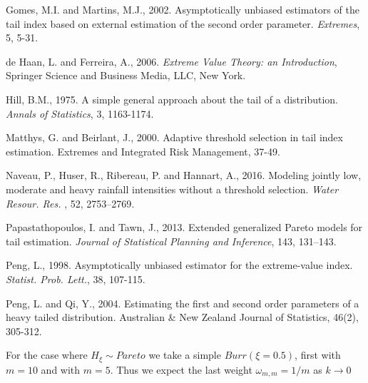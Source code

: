\documentclass[a4paper,11pt]{article}
\begin{document}
\begin{thebibliography}{99}
  Gomes, M.I. and Martins, M.J., 2002. Asymptotically unbiased estimators of the tail index based on external estimation of the second order parameter. {\it Extremes}, 5, 5-31.
  
de Haan, L. and Ferreira, A., 2006. {\it Extreme Value Theory: an Introduction}, Springer Science and Business Media, LLC, New York.  
  
 Hill, B.M., 1975. A simple general approach about the tail of a distribution. {\it Annals of Statistics}, 3, 1163-1174.
 
 Matthys, G. and Beirlant, J., 2000. Adaptive threshold selection in tail index estimation. Extremes and Integrated Risk Management, 37-49.

Naveau, P., Huser, R., Ribereau, P. and Hannart, A., 2016. Modeling jointly low, moderate and heavy rainfall intensities without a threshold selection. {\it Water Resour. Res. }, 52,
  2753--2769.

Papastathopoulos, I. and Tawn, J., 2013. Extended generalized Pareto models for tail estimation. {\it Journal of Statistical Planning and Inference}, 143, 131--143.

Peng, L., 1998. Asymptotically unbiased estimator for the extreme-value index. {\it Statist. Prob. Lett.}, 38, 107-115.

Peng, L. and Qi, Y., 2004. Estimating the first and second order parameters of a heavy tailed distribution. Australian \& New Zealand Journal of Statistics, 46(2), 305-312.
\end{thebibliography}		


\newpage
For the case where $H_{\xi} \sim Pareto$ we take a simple $Burr(\xi=0.5)$, first with $m=10$ and with $m=5$. Thus we expect the last weight $\omega_{m,m} = 1/m$ as $k \rightarrow 0$
\end{document}
